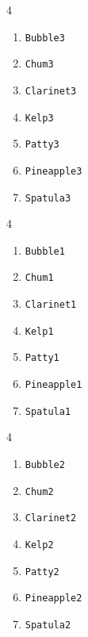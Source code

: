 \begin{multicols}4
    \begin{enumerate}
        \item \texttt{Bubble3}
        \item \texttt{Chum3}
        \item \texttt{Clarinet3}
        \item \texttt{Kelp3}
        \item \texttt{Patty3}
        \item \texttt{Pineapple3}
        \item \texttt{Spatula3}
    \end{enumerate}
\end{multicols}

\begin{multicols}4
    \begin{enumerate}
        \item \texttt{Bubble1}
        \item \texttt{Chum1}
        \item \texttt{Clarinet1}
        \item \texttt{Kelp1}
        \item \texttt{Patty1}
        \item \texttt{Pineapple1}
        \item \texttt{Spatula1}
    \end{enumerate}
\end{multicols}

\begin{multicols}4
    \begin{enumerate}
        \item \texttt{Bubble2}
        \item \texttt{Chum2}
        \item \texttt{Clarinet2}
        \item \texttt{Kelp2}
        \item \texttt{Patty2}
        \item \texttt{Pineapple2}
        \item \texttt{Spatula2}
    \end{enumerate}
\end{multicols}
